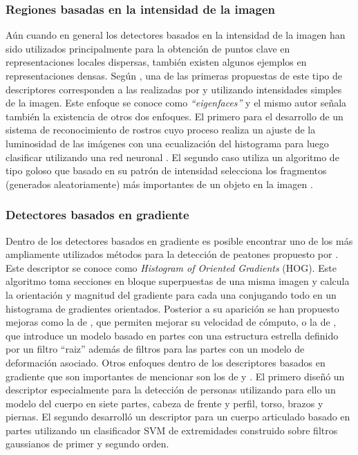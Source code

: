 \subsubsection{Regiones basadas en la intensidad de la imagen}

Aún cuando en general los detectores basados en la intensidad de la imagen han sido utilizados principalmente para la obtención de puntos clave en representaciones locales dispersas, también existen algunos ejemplos en representaciones densas. Según \cite{dalal2006}, una de las primeras propuestas de este tipo de descriptores corresponden a las realizadas por \cite{Sirovich1987} y \cite{Turk1991} utilizando intensidades simples de la imagen. Este enfoque se conoce como \textit{``eigenfaces''} y el mismo autor señala también la existencia de otros dos enfoques. El primero para el desarrollo de un sistema de reconocimiento de rostros cuyo proceso realiza un ajuste de la luminosidad de las imágenes con una ecualización del histograma para luego clasificar utilizando una red neuronal \citep{Rowley1998}. El segundo caso utiliza un algoritmo de tipo goloso que basado en su patrón de intensidad selecciona los fragmentos (generados aleatoriamente) más importantes de un objeto en la imagen \citep{Ullman2001}.

\subsubsection{Detectores basados en gradiente}

Dentro de los detectores basados en gradiente es posible encontrar uno de los más ampliamente utilizados métodos para la detección de peatones propuesto por \cite{dalal2005}. Este descriptor se conoce como \textit{Histogram of Oriented Gradients} (HOG). Este algoritmo toma secciones en bloque superpuestas de una misma imagen y calcula la orientación y magnitud del gradiente para cada una conjugando todo en un histograma de gradientes orientados. Posterior a su aparición se han propuesto mejoras como la de \cite{Zhu2006}, que permiten mejorar su velocidad de cómputo, o la de \cite{Felzenszwalb2009}, que introduce un modelo basado en partes con una estructura estrella definido por un filtro ``raiz'' además de filtros para las partes con un modelo de deformación asociado. Otros enfoques dentro de los descriptores basados en gradiente que son importantes de mencionar son los de \cite{Mikolajczyk2004a} y \cite{Ronfard2002}. El primero diseñó un descriptor especialmente para la detección de personas utilizando para ello un modelo del cuerpo en siete partes, cabeza de frente y perfil, torso, brazos y piernas. El segundo desarrolló un descriptor para un cuerpo articulado basado en partes utilizando un clasificador SVM de extremidades construido sobre filtros gaussianos de primer y segundo orden.

